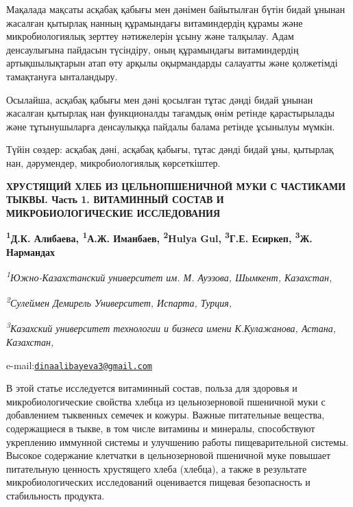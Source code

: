 Мақалада мақсаты асқабақ қабығы мен дәнімен байытылған бүтін бидай
ұнынан жасалған қытырлақ нанның құрамындағы витаминдердің құрамы және
микробиологиялық зерттеу нәтижелерін ұсыну және талқылау. Адам
денсаулығына пайдасын түсіндіру, оның құрамындағы витаминдердің
артықшылықтарын атап өту арқылы оқырмандарды салауатты және қолжетімді
тамақтануға ынталандыру.

Осылайша, асқабақ қабығы мен дәні қосылған тұтас дәнді бидай ұнынан
жасалған қытырлақ нан функционалды тағамдық өнім ретінде қарастырылады
және тұтынушыларға денсаулыққа пайдалы балама ретінде ұсынылуы мүмкін.

Түйін сөздер: асқабақ дәні, асқабақ қабығы, тұтас дәнді бидай ұны,
қытырлақ нан, дәрумендер, микробиологиялық көрсеткіштер.

\begin{articleheader}
{\bfseries ХРУСТЯЩИЙ ХЛЕБ ИЗ ЦЕЛЬНОПШЕНИЧНОЙ МУКИ С ЧАСТИКАМИ ТЫКВЫ. Часть 1. ВИТАМИННЫЙ СОСТАВ И МИКРОБИОЛОГИЧЕСКИЕ ИССЛЕДОВАНИЯ}

{\bfseries
\textsuperscript{1}Д.К. Алибаева\textsuperscript{\envelope },
\textsuperscript{1}А.Ж. Иманбаев,
\textsuperscript{2}Hulya Gul,
\textsuperscript{3}Г.Е. Есиркеп,
\textsuperscript{3}Ж. Нармандах}
\end{articleheader}

\begin{affiliation}
\emph{\textsuperscript{1}Южно-Казахстанский университет им. М. Ауэзова, Шымкент, Казахстан,}

\emph{\textsuperscript{2}Сулеймен Демирель Университет, Испарта, Турция,}

\emph{\textsuperscript{3}Казахский университет технологии и бизнеса имени К.Кулажанова, Астана, Казахстан,}

e-mail:\href{mailto:dinaalibayeva3@gmail.com}{\nolinkurl{dinaalibayeva3@gmail.com}}
\end{affiliation}

В этой статье исследуется витаминный состав, польза для здоровья и
микробиологические свойства хлебца из цельнозерновой пшеничной муки с
добавлением тыквенных семечек и кожуры. Важные питательные вещества,
содержащиеся в тыкве, в том числе витамины и минералы, способствуют
укреплению иммунной системы и улучшению работы пищеварительной системы.
Высокое содержание клетчатки в цельнозерновой пшеничной муке повышает
питательную ценность хрустящего хлеба (хлебца), а также в результате
микробиологических исследований оценивается пищевая безопасность и
стабильность продукта.

